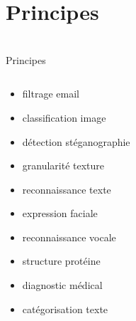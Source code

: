 \section{Principes}
\begin{frame}{\bititle\\Principes}
\begin{columns}\begin{column}{.5\textwidth}

\begin{itemize}
\item<1-> filtrage email
\item<2-> classification image
\item<3-> détection stéganographie
\item<4-> granularité texture
\item<5-> reconnaissance texte
\item<6-> expression faciale
\item<7-> reconnaissance vocale
\item<8-> structure protéine
\item<9-> diagnostic médical
\item<10-> catégorisation texte
\end{itemize}

\end{column}\begin{column}{.5\textwidth}


\end{column}\end{columns}
\end{frame}
